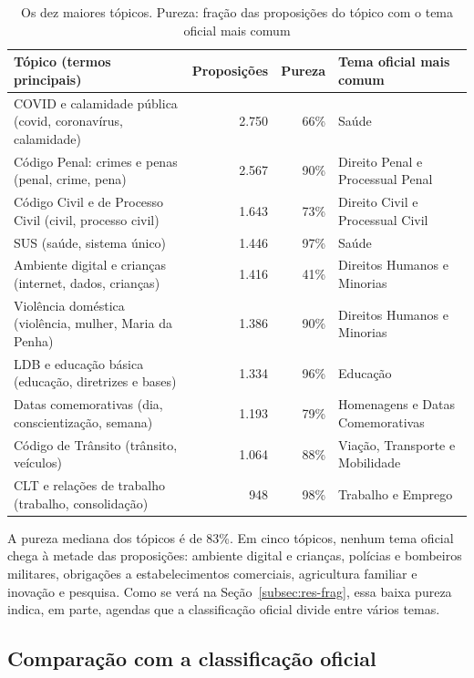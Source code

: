 \begin{table}[H]
\centering
\caption{Os dez maiores tópicos. Pureza: fração das proposições do tópico com o tema oficial mais comum}
\label{tab:maiores}
\small
\begin{tabularx}{\textwidth}{>{\raggedright\arraybackslash}X r r >{\raggedright\arraybackslash}p{4.8cm}}
\toprule
\textbf{Tópico (termos principais)} & \textbf{Proposições} & \textbf{Pureza} & \textbf{Tema oficial mais comum} \\
\midrule
COVID e calamidade pública (covid, coronavírus, calamidade) & 2.750 & 66\% & Saúde \\
Código Penal: crimes e penas (penal, crime, pena) & 2.567 & 90\% & Direito Penal e Processual Penal \\
Código Civil e de Processo Civil (civil, processo civil) & 1.643 & 73\% & Direito Civil e Processual Civil \\
SUS (saúde, sistema único) & 1.446 & 97\% & Saúde \\
Ambiente digital e crianças (internet, dados, crianças) & 1.416 & 41\% & Direitos Humanos e Minorias \\
Violência doméstica (violência, mulher, Maria da Penha) & 1.386 & 90\% & Direitos Humanos e Minorias \\
LDB e educação básica (educação, diretrizes e bases) & 1.334 & 96\% & Educação \\
Datas comemorativas (dia, conscientização, semana) & 1.193 & 79\% & Homenagens e Datas Comemorativas \\
Código de Trânsito (trânsito, veículos) & 1.064 & 88\% & Viação, Transporte e Mobilidade \\
CLT e relações de trabalho (trabalho, consolidação) & 948 & 98\% & Trabalho e Emprego \\
\bottomrule
\end{tabularx}
\end{table}

A pureza mediana dos tópicos é de 83\%. Em cinco tópicos, nenhum tema oficial chega à metade das proposições: ambiente digital e crianças, polícias e bombeiros militares, obrigações a estabelecimentos comerciais, agricultura familiar e inovação e pesquisa. Como se verá na Seção~\ref{subsec:res-frag}, essa baixa pureza indica, em parte, agendas que a classificação oficial divide entre vários temas.

\subsection{Comparação com a classificação oficial}
\label{subsec:res-bcubed}

